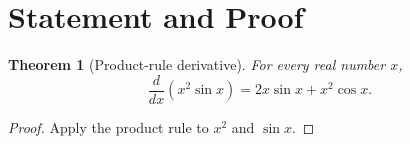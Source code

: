 \documentclass[11pt]{article}
\newtheorem{theorem}{Theorem}
\begin{document}
\section*{Statement and Proof}

\begin{theorem}[Product-rule derivative]
For every real number $x$,
\[
  \frac{d}{dx}\left(x^2\sin x\right) = 2x\sin x + x^2\cos x.
\]
\end{theorem}

\begin{proof}
Apply the product rule to $x^2$ and $\sin x$.
\end{proof}
\end{document}
